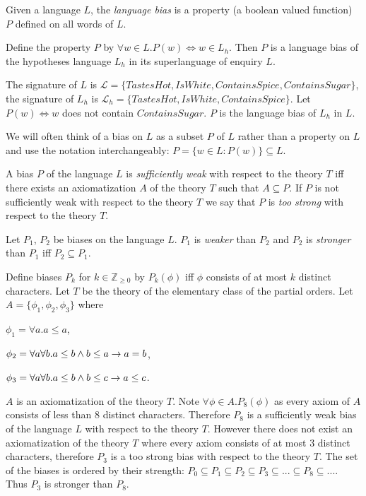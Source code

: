 \begin{defn}
Given a language $L$, the \emph{language bias} is a property (a boolean valued function) $P$ defined on all words of $L$.
\end{defn}

\begin{exmp}
Define the property $P$ by $\forall w \in L. P(w) \iff w \in L_h$. Then $P$ is a language bias of the hypotheses language $L_h$ in its superlanguage of enquiry $L$.
\end{exmp}

\begin{exmp}
The signature of $L$ is
$\mathcal{L}=\{TastesHot, IsWhite, ContainsSpice, ContainsSugar\}$,
the signature of $L_h$ is
$\mathcal{L}_h=\{TastesHot, IsWhite, ContainsSpice\}$.
Let $P(w) \iff w$ does not contain $ContainsSugar$. $P$ is the language bias of $L_h$ in $L$.
\end{exmp}

\begin{remark}
We will often think of a bias on $L$ as a subset $P$ of $L$ rather than a property on $L$ and use the notation interchangeably:
$P=\{w \in L : P(w)\} \subseteq L$.
\end{remark}

\begin{defn}
A bias $P$ of the language $L$ is \emph{sufficiently weak} with respect to the theory $T$ iff there exists an axiomatization $A$ of the theory $T$ such that $A \subseteq P$. If $P$ is not sufficiently weak with respect to the theory $T$ we say that $P$ is \emph{too strong} with respect to the theory $T$.
\end{defn}

\begin{defn}
Let $P_1$, $P_2$ be biases on the language $L$. $P_1$ is \emph{weaker} than $P_2$ and $P_2$ is \emph{stronger} than $P_1$ iff $P_2 \subseteq P_1$.
\end{defn}

\begin{exmp}
Define biases $P_k$ for $k \in \mathbb{Z}_{\ge 0}$ by $P_k(\phi)$ iff $\phi$ consists of at most $k$ distinct characters. Let $T$ be the theory of the elementary class of the partial orders. Let $A=\{\phi_1, \phi_2, \phi_3\}$ where

$\phi_1=\forall a. a \le a$,

$\phi_2=\forall a \forall b. a \le b \wedge b \le a \to a=b$,

$\phi_3=\forall a \forall b. a \le b \wedge b \le c \to a \le c$.

$A$ is an axiomatization of the theory $T$. Note $\forall \phi \in A. P_8(\phi)$ as every axiom of $A$ consists of less than $8$ distinct characters. Therefore $P_8$ is a sufficiently weak bias of the language $L$ with respect to the theory $T$. However there does not exist an axiomatization of the theory $T$ where every axiom consists of at most $3$ distinct characters, therefore $P_3$ is a too strong bias with respect to the theory $T$. The set of the biases is ordered by their strength:
$P_0 \subseteq P_1 \subseteq P_2 \subseteq P_3 \subseteq ... \subseteq P_8 \subseteq ...$. Thus $P_3$ is stronger than $P_8$.
\end{exmp}

